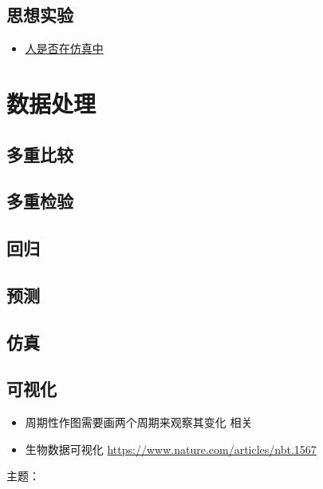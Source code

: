 \documentclass[]{book}
\providecommand{\tightlist}{%
  \setlength{\itemsep}{0pt}\setlength{\parskip}{0pt}}
\begin{document}
\section{思想实验}

\begin{itemize}
\tightlist
\item
  \href{https://www.vox.com/technology/2016/6/23/12007694/elon-musk-simulation-cartoon}{人是否在仿真中}
\end{itemize}

\chapter{数据处理}

\section{多重比较}

\section{多重检验}

\section{回归}

\section{预测}

\section{仿真}

\section{可视化}

\begin{itemize}
\tightlist
\item
  周期性作图需要画两个周期来观察其变化 相关
\item
  生物数据可视化 \url{https://www.nature.com/articles/nbt.1567}
\end{itemize}

主题：
\end{document}
